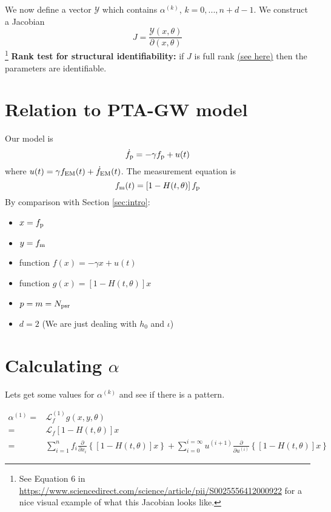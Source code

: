 \documentclass{tufte-handout} %
\begin{document}
\noindent We now define a vector $\mathcal{Y}$ which contains $\alpha^{(k)}$, $k=0,...,n+d-1$. We construct a Jacobian
\begin{equation}
	J = \frac{\mathcal{Y}(x,\theta)}{\partial(x, \theta)}
\end{equation}
\footnote{See Equation 6 in \url{https://www.sciencedirect.com/science/article/pii/S0025556412000922} for a nice visual example of what this Jacobian looks like.} \newline 
\textbf{Rank test for structural identifiability: } if $J$ is full rank \href{https://www.cds.caltech.edu/~murray/amwiki/index.php/FAQ:_What_does_it_mean_for_a_non-square_matrix_to_be_full_rank%3F#:~:text=A%20square%20matrix%20is%20full,in%20number)%20are%20linearly%20dependent.}{(see here)} then the parameters are identifiable. 



\section{Relation to PTA-GW model}
Our model is
\begin{equation}
	\dot{f}_{\rm p} = - \gamma f_{\rm p} + u(t)
\end{equation}
where $u(t) = \gamma f_{\rm EM}(t) + \dot{f}_{\rm EM} (t)$. The measurement equation is
\begin{equation}
	f_{\rm m}(t) = \left[1 - H(t,\theta) \right] f_{\rm p}
\end{equation}
By comparison with Section \ref{sec:intro}:

\begin{itemize}
	\item $x = f_{\rm p}$
	\item $y = f_{\rm m}$
	\item function $f(x) = -\gamma x + u(t)$
	\item function $g(x) = \left[1 - H(t,\theta) \right] x$
	\item $p = m = N_{\rm psr}$
	\item $d = 2$ (We are just dealing with $h_0$ and $\iota$)
\end{itemize}


\section{Calculating $\alpha$}

Lets get some values for $\alpha^{(k)}$ and see if there is a pattern. 


\begin{align}
	\alpha^{(1)} =& \mathcal{L}_f^{(1)} g(x,y,\theta) \\
	                     =& \mathcal{L}_f \left[1 - H(t,\theta) \right] x \\
	                     =&  \sum_{i=1}^{n} f_i \frac{\partial}{\partial x_i}  \left \{ \left[1 - H(t,\theta) \right] x\right \}+ \sum_{i=0}^{i = \infty} u^{(i+1)} \frac{\partial}{\partial u^{(i)}} \left \{ \left[1 - H(t,\theta) \right] x\right \} 
\end{align}
\end{document}
